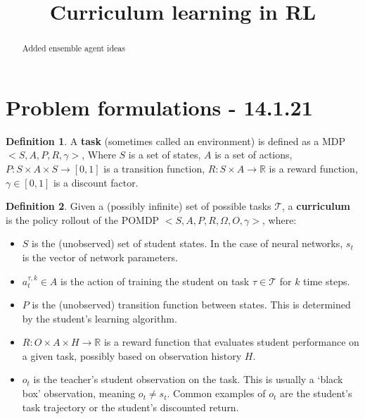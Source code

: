 \documentclass[letterpaper]{article}
\title{Curriculum learning in RL}
\theoremstyle{definition}
\newtheorem{defn}{Definition}[section]
\begin{document}
	\maketitle
	\begin{abstract}
		Added ensemble agent ideas
	\end{abstract}

\tableofcontents

\section{Problem formulations - 14.1.21} \label{sec:formulation}
\begin{defn}
	A \textbf{task} (sometimes called an environment) is defined as a MDP $<S,A,P,R,\gamma>$,
	Where $S$ is a set of states, $A$ is a set of actions, $P:S\times A\times S\rightarrow [0,1]$ is a transition function, 
	$R:S\times A\rightarrow \mathbb{R}$ is a reward function, $\gamma\in[0,1]$ is a discount factor.
\end{defn}

\begin{defn} \label{defn:curriculum-pomdp}
	Given a (possibly infinite) set of possible tasks $\mathcal{T}$, a \textbf{curriculum} is the policy rollout of the POMDP $<S,A,P,R,\Omega,O, \gamma>$, where:
	\begin{itemize}
		\item $S$ is the (unobserved) set of student states. In the case of neural networks, $s_t$ is the vector of network parameters.
		\item $a_{t}^{\tau, k}\in A$ is the action of training the student on task $\tau\in \mathcal{T}$ for $k$ time steps.
		\item $P$ is the (unobserved) transition function between states. This is determined by the student's learning algorithm.
		\item $R:O\times A\times H \rightarrow \mathbb{R}$ is a reward function that evaluates student performance on a given task, possibly based on observation history $H$.
		\item $o_t$ is the teacher's student observation on the task. This is usually a `black box' observation, meaning $o_t\neq s_t$. Common examples of $o_t$ are the student's task trajectory or the student's discounted return.
	\end{itemize}	
\end{defn}
\end{document}
